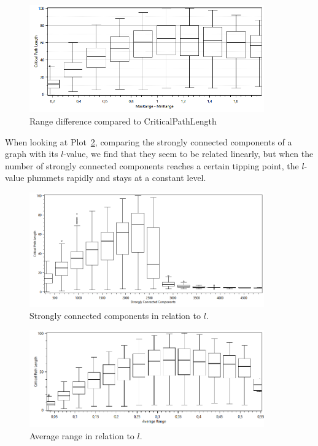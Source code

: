 \begin{figure}[ht]
	\centering
		\includegraphics[width=0.9\textwidth]{figures/plots/boxplotrangediffl.png}
	\caption{Range difference compared to CriticalPathLength}
	\label{fig:scatterplotrangediffl}
\end{figure}

When looking at Plot~\ref{fig:boxplotstronglyconnectedcomponentsl}, comparing the strongly connected components of a graph with its $l$-value, we find that they seem to be related linearly, but when the number of strongly connected components reaches a certain tipping point, the $l$-value plummets rapidly and stays at a constant level.

\begin{figure}[ht]
	\centering
		\includegraphics[width=0.9\textwidth]{figures/plots/boxplotstronglyconnectedcomponentsl.png}
	\caption{Strongly connected components in relation to $l$.}
	\label{fig:boxplotstronglyconnectedcomponentsl}
\end{figure}

\begin{figure}[ht]
	\centering
		\includegraphics[width=0.9\textwidth]{figures/plots/boxplotaveragerangel.png}
	\caption{Average range in relation to $l$.}
	\label{fig:boxplotaveragerangel}
\end{figure}

